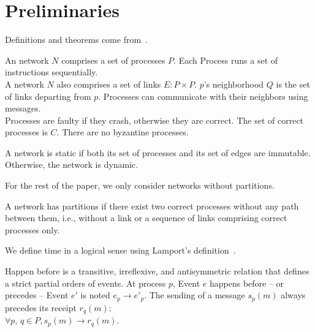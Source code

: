 
\section{Preliminaries}
\label{sec:preliminaries}

Definitions and theorems come from~\cite{hadzilacos1994modular}.

\begin{definition}
  An  network $N$ comprises a set of processes $P$. Each Process
  runs a set of
  instructions sequentially. \\
  A network $N$ also comprises a set of links $E: P \times P$. $p$'s
  neighborhood $Q$ is the set of links departing from $p$. Processes can
  communicate with their
  neighbors using messages. \\
  Processes are faulty if they crash, otherwise they are correct. The set of
  correct processes is $C$. There are no byzantine processes.
\end{definition}

\begin{definition}
  A network is static if both its set of processes and its set of edges are
  immutable. Otherwise, the network is dynamic.
\end{definition}

For the rest of the paper, we only consider networks without partitions.

\begin{definition}
  A network has partitions if there exist two correct processes without any path
  between them, i.e., without a link or a sequence of links comprising correct
  processes only.
\end{definition}


We define time in a logical sense using Lamport's
definition~\cite{lamport1978time}.

\begin{definition}
  Happen before is a transitive, irreflexive, and antisymmetric relation that
  defines a strict partial orders of events. At process $p$, Event $e$ happens
  before -- or precedes -- Event $e'$ is noted $e_p \rightarrow e'_p$. The
  sending of a message $s_p(m)$ always precedes its receipt $r_q(m)$: \\
  $\forall p,\,q \in P, s_p(m) \rightarrow r_q(m)$.
\end{definition}

